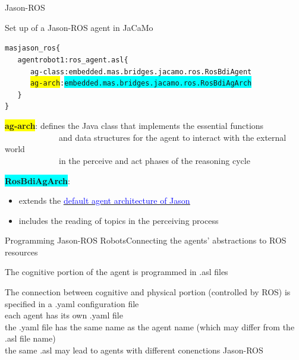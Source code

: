 \documentclass[compress]{beamer}
\begin{document}
\begin{frame}[fragile]{Jason-ROS}

\scriptsize
\begin{block}{Set up of a Jason-ROS agent in JaCaMo}
  \begin{alltt}\scriptsize
   mas jason\_ros \{  
   \ \ \ agent robot1: ros\_agent.asl \{
   \ \ \ \ \ \ ag-class: embedded.mas.bridges.jacamo.ros.RosBdiAgent
   \ \ \ \ \ \ \colorbox{yellow}{ag-arch}: \colorbox{cyan}{embedded.mas.bridges.jacamo.ros.RosBdiAgArch}
   \ \ \ \}
  \}
  \end{alltt}    
\end{block}

\footnotesize
\colorbox{yellow}{\bf ag-arch}: defines the Java class that implements the essential functions\\ \ \ \ \ \ \ \ \ \ \ \ \ \ and data structures for the agent to interact with the external world\\ \ \ \ \ \ \ \ \ \ \ \ \ \  {\tiny in the perceive and act phases of the reasoning cycle}

\vspace{.3cm}

\colorbox{cyan}{\bf RosBdiAgArch}: 
\begin{itemize}
 \item extends the \href{https://github.com/jason-lang/jason/blob/main/jason-interpreter/src/main/java/jason/architecture/AgArch.java}{\underline{\textcolor{blue}{default agent architecture of Jason}}}\\
 \item includes the reading of topics in the perceiving process
\end{itemize}


 
\end{frame}





\begin{frame}{Programming Jason-ROS Robots}{Connecting the agents' abstractions to ROS resources}

The cognitive portion of the agent is programmed in .asl files\\ \vspace{.5cm}
 
The connection between cognitive and physical portion (controlled by ROS)
is specified in a .yaml configuration file\\ \vspace{-.2cm}
{\tiny each agent has its own .yaml file}\\ \vspace{-.2cm}
{\tiny the .yaml file has the same name as the agent name (which may differ from the .asl file name)}\\ \vspace{-.2cm}
{\tiny the same .asl may lead to agents with different conenctions Jason-ROS}

 
\end{frame}
\end{document}
